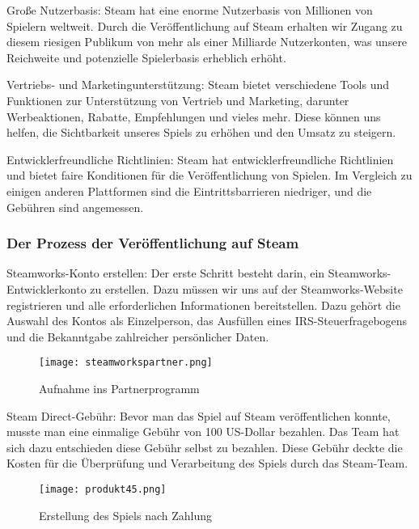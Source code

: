 \begin{liste}
   \item Große Nutzerbasis: Steam hat eine enorme Nutzerbasis von Millionen von Spielern weltweit. Durch die Veröffentlichung auf Steam erhalten wir Zugang zu diesem riesigen Publikum von mehr als einer Milliarde Nutzerkonten, was unsere Reichweite und potenzielle Spielerbasis erheblich erhöht.
   \item Vertriebs- und Marketingunterstützung: Steam bietet verschiedene Tools und Funktionen zur Unterstützung von Vertrieb und Marketing, darunter Werbeaktionen, Rabatte, Empfehlungen und vieles mehr. Diese können uns helfen, die Sichtbarkeit unseres Spiels zu erhöhen und den Umsatz zu steigern.
   \item Entwicklerfreundliche Richtlinien: Steam hat entwicklerfreundliche Richtlinien und bietet faire Konditionen für die Veröffentlichung von Spielen. Im Vergleich zu einigen anderen Plattformen sind die Eintrittsbarrieren niedriger, und die Gebühren sind angemessen.
\end{liste}

\subsubsection{Der Prozess der Veröffentlichung auf Steam}\label{subsubsec:Veröffentlichungsprozess}

Steamworks-Konto erstellen:
Der erste Schritt besteht darin, ein Steamworks-Entwicklerkonto zu erstellen.
Dazu müssen wir uns auf der Steamworks-Website registrieren und alle erforderlichen Informationen bereitstellen.
Dazu gehört die Auswahl des Kontos als Einzelperson, das Ausfüllen eines IRS-Steuerfragebogens und die Bekanntgabe zahlreicher persönlicher Daten.
\begin{figure}[H]
    \texttt{[image: steamworkspartner.png]}
    \caption{Aufnahme ins Partnerprogramm}
\end{figure}

Steam Direct-Gebühr:
Bevor man das Spiel auf Steam veröffentlichen konnte, musste man eine einmalige Gebühr von 100 US-Dollar bezahlen.
Das Team hat sich dazu entschieden diese Gebühr selbst zu bezahlen.
Diese Gebühr deckte die Kosten für die Überprüfung und Verarbeitung des Spiels durch das Steam-Team.
\begin{figure}[H]
    \texttt{[image: produkt45.png]}
    \caption{Erstellung des Spiels nach Zahlung}
\end{figure}

